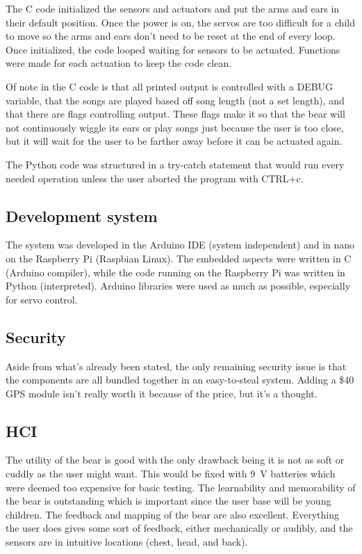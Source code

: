 \documentclass{article}
\begin{document}
The C code initialized the sensors and actuators and put the arms and ears in their default position. Once the power is on, the servos are too difficult for a child to move so the arms and ears don't need to be reset at the end of every loop. Once initialized, the code looped waiting for sensors to be actuated. Functions were made for each actuation to keep the code clean.

Of note in the C code is that all printed output is controlled with a DEBUG variable, that the songs are played based off song length (not a set length), and that there are flags controlling output. These flags make it so that the bear will not continuously wiggle its ears or play songs just because the user is too close, but it will wait for the user to be farther away before it can be actuated again.

The Python code was structured in a try-catch statement that would run every needed operation unless the user aborted the program with CTRL+c.

\subsection{Development system}
The system was developed in the Arduino IDE (system independent) and in nano on the Raspberry Pi (Raspbian Linux). The embedded aspects were written in C (Arduino compiler), while the code running on the Raspberry Pi was written in Python (interpreted). Arduino libraries were used as much as possible, especially for servo control.

\subsection{Security}
Aside from what's already been stated, the only remaining security issue is that the components are all bundled together in an easy-to-steal system. Adding a \$40 GPS module isn't really worth it because of the price, but it's a thought.

\subsection{HCI}
The utility of the bear is good with the only drawback being it is not as soft or cuddly as the user might want. This would be fixed with 9~V batteries which were deemed too expensive for basic testing. The learnability and memorability of the bear is outstanding which is important since the user base will be young children. The feedback and mapping of the bear are also excellent. Everything the user does gives some sort of feedback, either mechanically or audibly, and the sensors are in intuitive locations (chest, head, and back).
\end{document}
